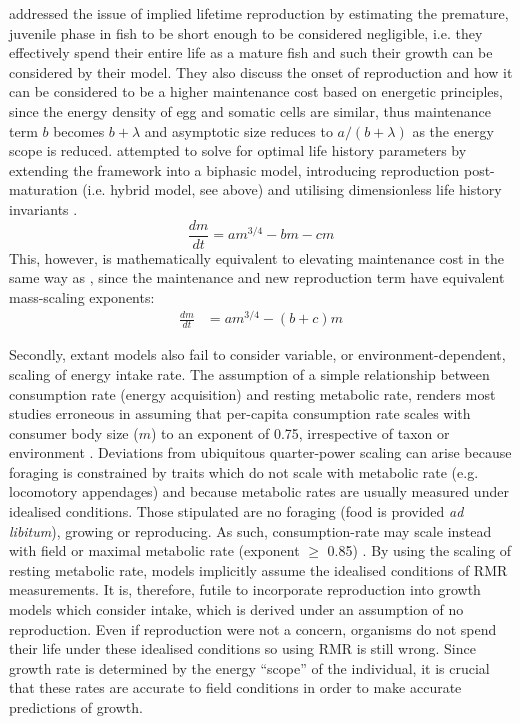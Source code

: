 \documentclass[a4paper]{article} %
\begin{document}
        \cite{West2001} addressed the issue of implied lifetime reproduction by estimating the premature, juvenile phase in fish to be short enough to be considered negligible, i.e. they effectively spend their entire life as a mature fish and such their growth can be considered by their model. They also discuss the onset of reproduction and how it can be considered to be a higher maintenance cost based on energetic principles, since the energy density of egg and somatic cells are similar, thus maintenance term $b$ becomes $b + \lambda$ and asymptotic size reduces to $a/(b+\lambda)$ as the energy scope is reduced. \cite{Charnov2001} attempted to solve for optimal life history parameters by extending the \cite{West2001} framework into a biphasic model, introducing reproduction post-maturation (i.e. hybrid model, see above) and utilising dimensionless life history invariants \autocite{Charnov1993}.
        \begin{equation}
            \frac{dm}{dt} = am^{3/4} - bm - cm \label{charnov_ogm}
        \end{equation}
        This, however, is mathematically equivalent to elevating maintenance cost in the same way as \cite{West2001}, since the maintenance and new reproduction term have equivalent mass-scaling exponents:
        \begin{align*}
            \frac{dm}{dt} &= am^{3/4} - (b+c)m
        \end{align*}

        Secondly, extant models also fail to consider variable, or environment-dependent, scaling of energy intake rate. The assumption of a simple relationship between consumption rate (energy acquisition) and resting metabolic rate, renders most studies erroneous in assuming that per-capita consumption rate scales with consumer body size ($m$) to an exponent of 0.75, irrespective of taxon or environment \autocite{Pawar2012}. Deviations from ubiquitous quarter-power scaling can arise because foraging is constrained by traits which do not scale with metabolic rate (e.g. locomotory appendages) and because metabolic rates are usually measured under idealised conditions. Those stipulated are no foraging (food is provided \textit{ad libitum}), growing or reproducing. As such, consumption-rate may scale instead with field or maximal metabolic rate (exponent $\geq$ 0.85) \autocite{peters1983,Weibel2004, Pawar2012}. By using the scaling of resting metabolic rate, models implicitly assume the idealised conditions of RMR measurements. It is, therefore, futile to incorporate reproduction into growth models which consider intake, which is derived under an assumption of no reproduction. Even if reproduction were not a concern, organisms do not spend their life under these idealised conditions so using RMR is still wrong. Since growth rate is determined by the energy ``scope'' of the individual, it is crucial that these rates are accurate to field conditions in order to make accurate predictions of growth.
\end{document}
